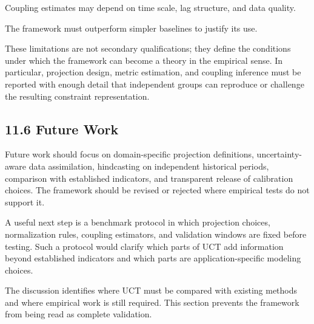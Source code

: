 Coupling estimates may depend on time scale, lag structure, and data quality.

The framework must outperform simpler baselines to justify its use.

These limitations are not secondary qualifications; they define the conditions under which the framework can become a theory in the empirical sense. In particular, projection design, metric estimation, and coupling inference must be reported with enough detail that independent groups can reproduce or challenge the resulting constraint representation.

\subsection{11.6 Future Work}

Future work should focus on domain-specific projection definitions, uncertainty-aware data assimilation, hindcasting on independent historical periods, comparison with established indicators, and transparent release of calibration choices. The framework should be revised or rejected where empirical tests do not support it.

A useful next step is a benchmark protocol in which projection choices, normalization rules, coupling estimators, and validation windows are fixed before testing. Such a protocol would clarify which parts of UCT add information beyond established indicators and which parts are application-specific modeling choices.

The discussion identifies where UCT must be compared with existing methods and where empirical work is still required. This section prevents the framework from being read as complete validation.


